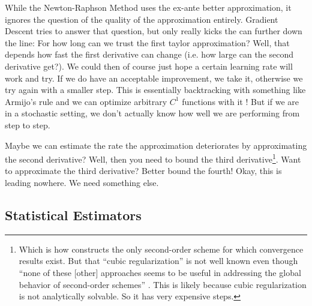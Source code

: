 While the Newton-Raphson Method uses the ex-ante better approximation, it
ignores the question of the quality of the approximation entirely. Gradient
Descent tries to answer that question, but only really kicks the can further
down the line: For how long can we trust the first taylor approximation? Well,
that depends how fast the first derivative can change (i.e. how large can the
second derivative get?). We could then of course just hope a certain learning
rate will work and try. If we do have an acceptable improvement, we take it,
otherwise we try again with a smaller step. This is essentially backtracking with 
something like Armijo's rule and we can optimize arbitrary \(C^1\) functions with it
\parencite{truongBacktrackingGradientDescent2019}!
But if we are in a stochastic setting, we don't actually know how well we are
performing from step to step.


Maybe we can estimate the rate the approximation deteriorates by
approximating the second derivative? Well, then you need to bound the third
derivative\footnote{
	Which is how \textcite[Section 4.1]{nesterovLecturesConvexOptimization2018}
	constructs the only second-order scheme for which convergence results exist.
	But that ``cubic regularization'' is not well known even though ``none of
	these [other] approaches seems to be useful in addressing the global behavior
	of second-order schemes'' \parencite[p.
	242]{nesterovLecturesConvexOptimization2018}. This is likely because cubic
	regularization is not analytically solvable. So it has very expensive steps.
}. Want to approximate the third derivative? Better bound the fourth!  Okay,
this is leading nowhere. We need something else.

\subsection{Statistical Estimators}

